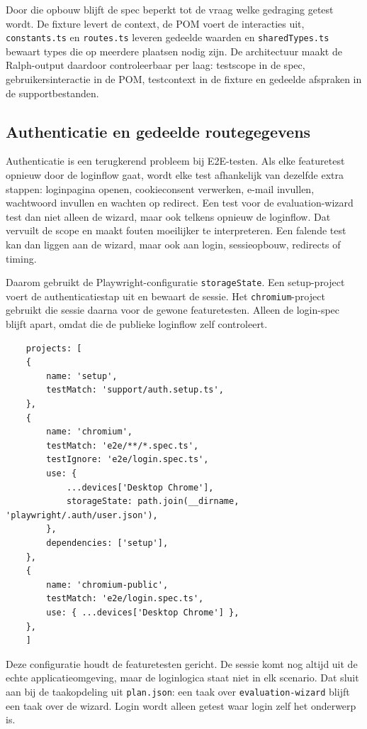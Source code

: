 Door die opbouw blijft de spec beperkt tot de vraag welke gedraging getest wordt. De fixture levert de context, de POM voert de interacties uit, \texttt{constants.ts} en \texttt{routes.ts} leveren gedeelde waarden en \texttt{sharedTypes.ts} bewaart types die op meerdere plaatsen nodig zijn. De architectuur maakt de Ralph-output daardoor controleerbaar per laag: testscope in de spec, gebruikersinteractie in de POM, testcontext in de fixture en gedeelde afspraken in de supportbestanden.

\subsection{Authenticatie en gedeelde routegegevens}

Authenticatie is een terugkerend probleem bij E2E-testen. Als elke featuretest opnieuw door de loginflow gaat, wordt elke test afhankelijk van dezelfde extra stappen: loginpagina openen, cookieconsent verwerken, e-mail invullen, wachtwoord invullen en wachten op redirect. Een test voor de evaluation-wizard test dan niet alleen de wizard, maar ook telkens opnieuw de loginflow. Dat vervuilt de scope en maakt fouten moeilijker te interpreteren. Een falende test kan dan liggen aan de wizard, maar ook aan login, sessieopbouw, redirects of timing.

Daarom gebruikt de Playwright-configuratie \texttt{storageState}. Een setup-project voert de authenticatiestap uit en bewaart de sessie. Het \texttt{chromium}-project gebruikt die sessie daarna voor de gewone featuretesten. Alleen de login-spec blijft apart, omdat die de publieke loginflow zelf controleert.

\begin{verbatim}
    projects: [
    {
        name: 'setup',
        testMatch: 'support/auth.setup.ts',
    },
    {
        name: 'chromium',
        testMatch: 'e2e/**/*.spec.ts',
        testIgnore: 'e2e/login.spec.ts',
        use: {
            ...devices['Desktop Chrome'],
            storageState: path.join(__dirname, 'playwright/.auth/user.json'),
        },
        dependencies: ['setup'],
    },
    {
        name: 'chromium-public',
        testMatch: 'e2e/login.spec.ts',
        use: { ...devices['Desktop Chrome'] },
    },
    ]
\end{verbatim}

Deze configuratie houdt de featuretesten gericht. De sessie komt nog altijd uit de echte applicatieomgeving, maar de loginlogica staat niet in elk scenario. Dat sluit aan bij de taakopdeling uit \texttt{plan.json}: een taak over \texttt{evaluation-wizard} blijft een taak over de wizard. Login wordt alleen getest waar login zelf het onderwerp is.

